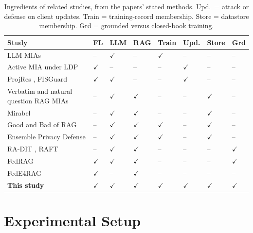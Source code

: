 \documentclass[11pt]{article}
\newcommand{\yes}{$\checkmark$}
\newcommand{\no}{--}
\begin{document}
\begin{table}[htbp]
\centering
\caption{Ingredients of related studies, from the papers' stated methods. Upd.\ = attack or defense on client updates. Train = training-record membership. Store = datastore membership. Grd = grounded versus closed-book training.}\label{tab:compare}
\small
\begin{tabular}{@{}L{0.33\textwidth}*{7}{C{0.06\textwidth}}@{}}
\toprule
Study & FL & LLM & RAG & Train & Upd. & Store & Grd \\
\midrule
LLM MIAs \citep{yeom2018privacy,carlini2021extracting,shi2024detecting,zhang2025minkpp,mattern2023membership,xie2024recall,kaneko2024sampling,fu2024membership,chen2026window} & \no & \yes & \no & \yes & \no & \no & \no \\
Active MIA under LDP \citep{nguyen2023active,nguyen2025theoretically} & \yes & \no & \no & \no & \yes & \no & \no \\
ProjRes \citep{deng2026projres}, FISGuard \citep{jiang2026fisguard} & \yes & \yes & \no & \no & \yes & \no & \no \\
Verbatim and natural-question RAG MIAs \citep{anderson2024membership,naseh2025riddle,nguyen2026menta} & \no & \yes & \yes & \no & \no & \yes & \no \\
Mirabel \citep{choi2025mirabel} & \no & \yes & \yes & \no & \no & \yes & \no \\
Good and Bad of RAG \citep{zeng2024good} & \no & \yes & \yes & \yes & \no & \yes & \no \\
Ensemble Privacy Defense \citep{fu2025ensemble} & \no & \yes & \yes & \yes & \no & \yes & \no \\
RA-DIT \citep{lin2024radit}, RAFT \citep{zhang2024raft} & \no & \yes & \yes & \no & \no & \no & \yes \\
FedRAG \citep{fajardo2025fedrag} & \yes & \yes & \yes & \no & \no & \no & \yes \\
FedE4RAG \citep{mao2025fede4rag} & \yes & \no & \yes & \no & \no & \no & \no \\
\midrule
\textbf{This study} & \yes & \yes & \yes & \yes & \yes & \yes & \yes \\
\bottomrule
\end{tabular}
\end{table}

\section{Experimental Setup}\label{sec:setup}
\end{document}
